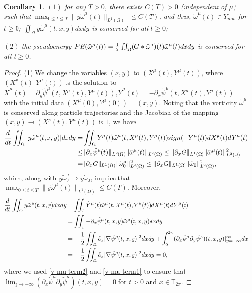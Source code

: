 \documentclass[1 [leqno, 11pt]{amsart}
\numberwithin{equation}{section}
\newtheorem{Corollary}[Theorem]{Corollary}
\begin{document}
\begin{CJK*}{GBK}{song}
\begin{appendix}
\begin{Corollary}
$(1)$ for any $T>0$, there exists $C(T)>0$ (independent of $\mu$) such that  $\max_{0\leq t\leq T} \|y\tilde\omega^{\mu}(t)\|_{ L^1(\Omega)}$ $\leq C(T)$, and thus, $\tilde\omega^{\mu}(t)\in Y_{non}$ for $t\geq0$;
$\iint_\Omega y\tilde\omega^{\mu}(t,x,y)dxdy$ is conserved for all $t\geq0$;

$(2)$ the pseudoenergy
$
PE(\tilde \omega^\mu(t))={1\over2}\iint_{\Omega}(G\ast\tilde \omega^\mu)(t)\tilde \omega^{\mu}(t) dxdy
$ is conserved for all $t\geq0$.
\end{Corollary}

\begin{proof}
(1) We change the variables $(x,y)$ to $(X^\mu(t),Y^\mu(t))$, where $(X^\mu(t),Y^\mu(t))$ is the solution to $\dot{X}^\mu(t)=\partial_y\tilde\psi^\mu(t,X^\mu(t), Y^\mu(t)),
\dot{Y}^\mu(t)=-\partial_x\tilde \psi^\mu(t,X^\mu(t), Y^\mu(t))$ with the initial data $(X^\mu(0),Y^\mu(0))=(x,y)$. Noting that the vorticity $\tilde\omega^\mu$ is conserved along particle trajectories and the Jacobian of the mapping $(x,y)\to(X^\mu(t),Y^\mu(t))$ is $1$, we have
\begin{align}\nonumber
{d\over dt}\iint_\Omega |y\tilde\omega^{\mu}(t,x,y)|dxdy=&\iint_\Omega \dot{Y}^\mu(t)\tilde\omega^{\mu}(t,X^\mu(t),Y^\mu(t))sign(-Y^\mu(t))dX^\mu(t)dY^\mu(t)\\\nonumber
\leq&\|\partial_x\tilde\psi^\mu(t)\|_{L^2(\Omega)}\|\tilde\omega^{\mu}(t)\|_{L^2(\Omega)}
\leq\|\partial_xG\|_{L^1(\Omega)}\|\tilde\omega^{\mu}(t)\|_{L^2(\Omega)}^2\\\nonumber
=&\|\partial_xG\|_{L^1(\Omega)}\|\tilde\omega_0^{\mu}\|_{L^2(\Omega)}^2\leq\|\partial_xG\|_{L^1(\Omega)}\|\tilde\omega_0\|_{L^2(\Omega)}^2,
\end{align}
which, along with $y\tilde \omega^{\mu}_0\to y\tilde \omega_0$, implies that $\max_{0\leq t\leq T} \|y\tilde\omega^{\mu}(t)\|_{ L^1(\Omega)}\leq C(T)$. Moreover,
\begin{align}\nonumber
{d\over dt}\iint_\Omega y\tilde\omega^{\mu}(t,x,y)dxdy=&\iint_\Omega \dot{Y}^\mu(t)\tilde\omega^{\mu}(t,X^\mu(t),Y^\mu(t))dX^\mu(t)dY^\mu(t)\\\nonumber
=&\iint_\Omega -\partial_x\tilde\psi^\mu(t,x,y)\tilde\omega^{\mu}(t,x,y)dxdy\\\nonumber
=&-{1\over2}\iint_\Omega \partial_x|\nabla\tilde\psi^\mu(t,x,y)|^2 dxdy+\int_0^{2\pi}(\partial_x\tilde\psi^\mu\partial_y\tilde\psi^\mu)(t,x,y)|_{y=-\infty}^\infty dx\\\nonumber
=&-{1\over2}\iint_\Omega \partial_x|\nabla\tilde\psi^\mu(t,x,y)|^2 dxdy=0,
\end{align}
where we used \eqref{v-mu term2} and \eqref{v-mu term1} to ensure that $\lim_{y\to\pm\infty}(\partial_x\tilde\psi^\mu\partial_y\tilde\psi^\mu)(t,x,y)=0$ for $t>0$ and $x\in\mathbb{T}_{2\pi}$.


\end{proof}
\end{appendix}
\end{CJK*}
\end{document}
